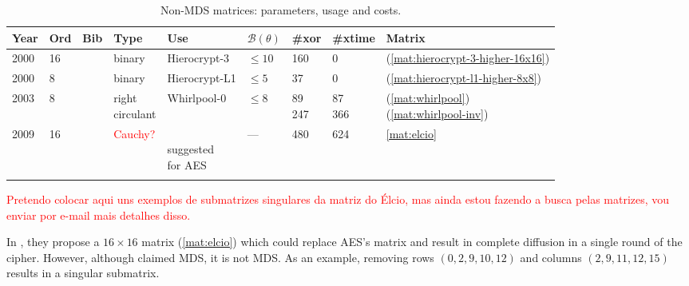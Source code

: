 \begin{footnotesize}
\begin{longtable}[c]{|l|l|l|l|l|l|l|l|l|}
\hline
\textbf{Year} & \textbf{Ord} & \textbf{Bib} & \textbf{Type} & \textbf{Use} & \textbf{$\mathcal{B}(\theta)$} & \textbf{\#xor} & \textbf{\#xtime} & \textbf{Matrix} \\ \hline
\endhead

2000 & 16 & \cite{Hierocrypt2000} & binary & Hierocrypt-3 & $\leq 10$ & 160 & 0 & (\ref{mat:hierocrypt-3-higher-16x16}) \\ \hline
2000 & 8 & \cite{Hierocrypt-L1-2000} & binary & Hierocrypt-L1 & $\leq 5$ & 37 & 0 & (\ref{mat:hierocrypt-l1-higher-8x8}) \\ \hline
2003 & 8 & \cite{Whirlpool2003} & \shortstack{right \\ circulant} & Whirlpool-0 & $\leq 8$ & \shortstack{89\\247} & \shortstack{87\\366} & \shortstack{(\ref{mat:whirlpool})\\(\ref{mat:whirlpool-inv})} \\ \hline
2009 & 16 & \cite{Nakahara2009} & \textcolor{red}{Cauchy?} & \shortstack{\\ suggested \\ for AES} & --- & 480 & 624 & \eqref{mat:elcio} \\ \hline

\caption{Non-MDS matrices: parameters, usage and costs.}\label{tbl:non-mds-list}
\end{longtable}
\end{footnotesize}

\textcolor{red}{Pretendo colocar aqui uns exemplos de submatrizes singulares da matriz do Élcio, mas ainda estou fazendo a busca pelas matrizes, vou enviar por e-mail mais detalhes disso.}

In \cite{Nakahara2009}, they propose a $16 \times 16$ matrix (\ref{mat:elcio}) which could replace AES's matrix and result in complete diffusion in a single round of the cipher. However, although claimed MDS, it is not MDS. As an example, removing rows $(0, 2, 9, 10, 12)$ and columns $(2, 9, 11, 12, 15)$ results in a singular submatrix.

